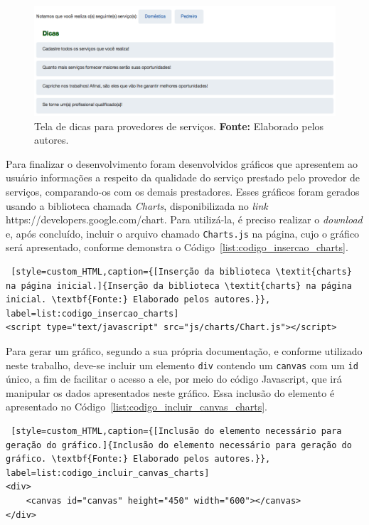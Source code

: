 \newpage
\begin{figure}[h!]
	\centerline{\includegraphics[scale=0.4]{./imagens/dicas-randomicas.png}}
	\caption[Tela de dicas para provedores de serviços.]
	{Tela de dicas para provedores de serviços. \textbf{Fonte:} Elaborado pelos autores.}
	\label{fig:dicas_randomicas}
\end{figure}

\par Para finalizar o desenvolvimento foram desenvolvidos gráficos que apresentem ao usuário informações a respeito da qualidade do serviço prestado pelo provedor de serviços, comparando-os com os demais prestadores. Esses gráficos foram gerados usando a biblioteca chamada \textit{Charts}, disponibilizada no \textit{link} https://developers.google.com/chart. Para utilizá-la, é preciso realizar o \textit{download} e, após concluído, incluir o arquivo chamado \texttt{Charts.js} na página, cujo o gráfico será apresentado, conforme demonstra o Código~\ref{list:codigo_insercao_charts}.

\begin{lstlisting} [style=custom_HTML,caption={[Inserção da biblioteca \textit{charts} na página inicial.]{Inserção da biblioteca \textit{charts} na página inicial. \textbf{Fonte:} Elaborado pelos autores.}}, label=list:codigo_insercao_charts] 	
<script type="text/javascript" src="js/charts/Chart.js"></script>
\end{lstlisting}

\par Para gerar um gráfico, segundo a sua própria documentação, e conforme utilizado neste trabalho, deve-se incluir um elemento \texttt{div} contendo um \texttt{canvas} com um \texttt{id} único, a fim de facilitar o acesso a ele, por meio do código Javascript, que irá manipular os dados apresentados neste gráfico. Essa inclusão do elemento é apresentado no Código~\ref{list:codigo_incluir_canvas_charts}.

\begin{lstlisting} [style=custom_HTML,caption={[Inclusão do elemento necessário para geração do gráfico.]{Inclusão do elemento necessário para geração do gráfico. \textbf{Fonte:} Elaborado pelos autores.}}, label=list:codigo_incluir_canvas_charts] 	
<div>
	<canvas id="canvas" height="450" width="600"></canvas>
</div>
\end{lstlisting}

